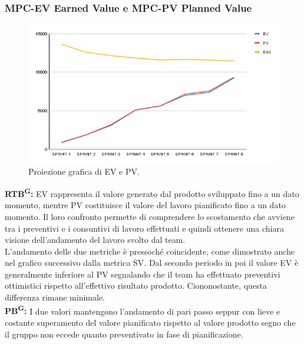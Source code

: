 \documentclass[8pt]{article}
\newcommand{\glossterm}[1]{#1\textsuperscript{G}} %
\begin{document}
\subsubsection{MPC-EV Earned Value e MPC-PV Planned Value}
\begin{figure}[h!]
    \centering
    \includegraphics[width=1\textwidth]{images_pdq/EV_PV.png}
    \caption{Proiezione grafica di EV e PV.}
    \label{fig:Proiezione grafica di EV e PV}
\end{figure}
\textbf{\glossterm{RTB}:} EV rappresenta il valore generato dal prodotto sviluppato fino a un dato momento, mentre PV costituisce il valore del lavoro pianificato fino a un dato momento. Il loro confronto permette di comprendere lo scostamento che avviene tra i preventivi e i consuntivi di lavoro effettuati e quindi ottenere una chiara visione dell'andamento del lavoro svolto dal team.\\
L'andamento delle due metriche è pressoché coincidente, come dimostrato anche nel grafico successivo dalla metrica SV. Dal secondo periodo in poi il valore EV è generalmente inferiore al PV segnalando che il team ha effettuato preventivi ottimistici rispetto all'effettivo risultato prodotto. Ciononostante, questa differenza rimane minimale.\\
\textbf{\glossterm{PB}:} I due valori mantengono l'andamento di pari passo seppur con lieve e costante superamento del valore pianificato rispetto al valore prodotto segno che il gruppo non eccede quanto preventivato in fase di pianificazione.
\clearpage
\end{document}
